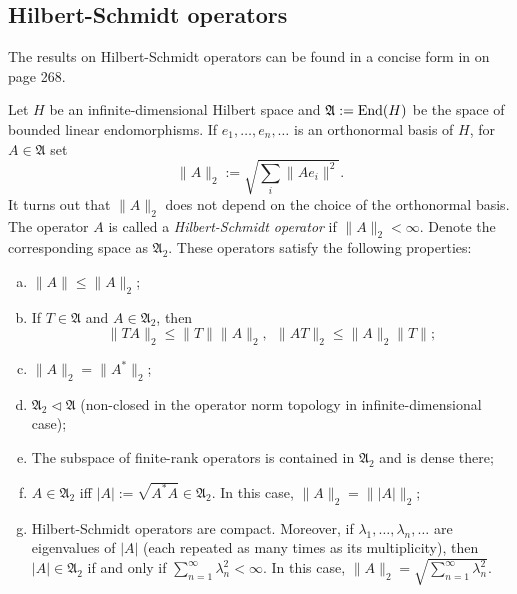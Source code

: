 \subsection{Hilbert-Schmidt operators}
The results on Hilbert-Schmidt operators can be found in a concise form in \cite{conway} on page 268.

Let $H$ be an infinite-dimensional Hilbert space and $\mathfrak A:= \operatorname{End}(H)$ be the space of bounded linear endomorphisms. If $e_1,\ldots,e_n,\ldots$ is an orthonormal basis of $H$, for $A \in \mathfrak A$ set
\[
\|A\|_2 := \sqrt{\sum_i \|Ae_i\|^2}.
\]
It turns out that $\|A\|_2$ does not depend on the choice of the orthonormal basis. The operator $A$ is called a \emph{Hilbert-Schmidt operator} if $\|A\|_2 < \infty$. Denote the corresponding space as $\mathfrak A_2$. These operators satisfy the following properties:
\begin{enumerate}[(a)]
\item $\|A\| \leq \|A\|_2$;
\item If $T \in \mathfrak A$ and $A \in \mathfrak A_2$, then
\[
\|TA\|_2 \leq \|T\| \|A\|_2, \ \ \|AT\|_2 \leq \|A\|_2 \|T\|;
\]
\item $\|A\|_2=\|A^*\|_2$;
\item $\mathfrak A_2 \triangleleft \mathfrak A$ (non-closed in the operator norm topology in infinite-dimensional case);
\item The subspace of finite-rank operators is contained in $\mathfrak A_2$ and is dense there;
\item $A \in \mathfrak A_2$ iff $|A|:= \sqrt{A^*A} \in \mathfrak A_2$. In this case, $\|A\|_2 = \||A|\|_2$;
\item Hilbert-Schmidt operators are compact. Moreover, if $\lambda_1,\ldots,\lambda_n,\ldots$ are eigenvalues of $|A|$ (each repeated as many times as its multiplicity), then $|A| \in \mathfrak A_2$ if and only if $\sum_{n=1}^\infty \lambda_n^2 < \infty$. In this case, $\|A\|_2 = \sqrt{\sum_{n=1}^\infty \lambda_n^2}$.
\end{enumerate}
